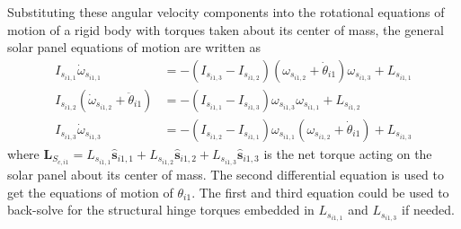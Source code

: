 \documentclass[paper]{aiaaNew}
\begin{document}
	Substituting these angular velocity components into the rotational equations of motion of a rigid body with torques taken about its center of mass\cite{schaub}, the general solar panel equations of motion are written as
	\begin{align}
	I_{s_{i1,1}} \dot\omega_{s_{i1,1}} &= - (I_{s_{i1,3}} - I_{s_{i1,2}}) (\omega_{s_{i1,2}}+\dot\theta_{i1})\omega_{s_{i1,3}} + L_{s_{i1,1}}
	\\
	I_{s_{i1,2}} ( \dot\omega_{s_{i1,2}} + \ddot\theta_{i1}) &= - (I_{s_{i1,1}} - I_{s_{i1,3}}) \omega_{s_{i1,3}} \omega_{s_{i1,1}} + L_{s_{i1,2}}
	\\
	I_{s_{i1,3}} \dot\omega_{s_{i1,3}} &= - (I_{s_{i1,2}} - I_{s_{i1,1}}) \omega_{s_{i1,1}}(\omega_{s_{i1,2}}+ \dot\theta_{i1}) + L_{s_{i1,3}}
	\end{align}
	where $\bm L_{S_{c,i1}} = L_{s_{i1,1}} \hat{\bm s}_{i1,1} + L_{s_{i1,2}} \hat{\bm s}_{i1,2} + L_{s_{i1,3}} \hat{\bm s}_{i1,3}$ is the net torque acting on the solar panel about its center of mass.  The second differential equation is used to get the equations of motion of $\theta_{i1}$.  The first and third equation could be used to back-solve for the structural hinge torques embedded in $L_{s_{i1,1}}$ and $L_{s_{i1,3}}$ if needed.  
	
\end{document}

